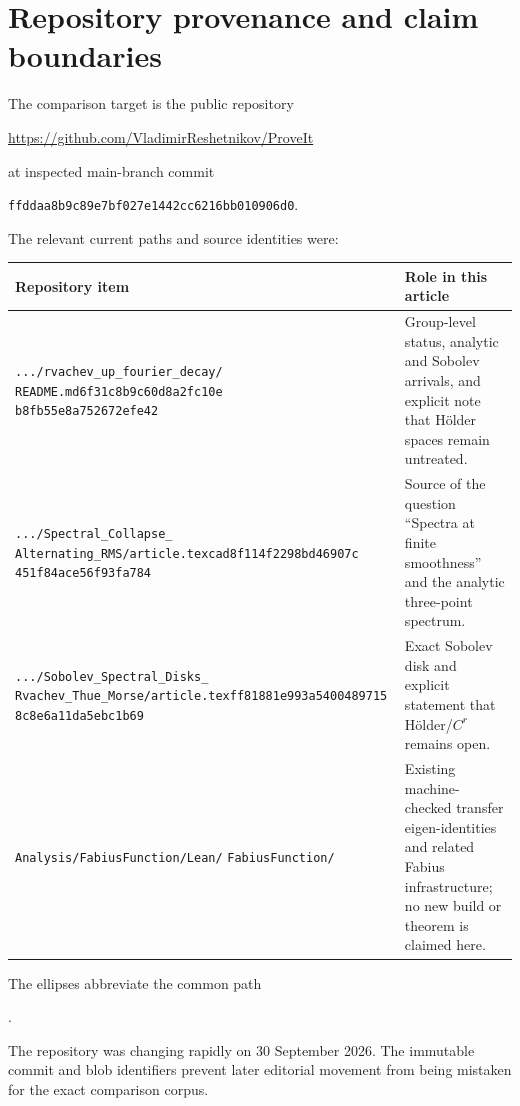 \documentclass[11pt,a4paper]{article}
\theoremstyle{definition}
\theoremstyle{remark}
\begin{document}
\section{Repository provenance and claim boundaries}
\label{app:provenance}
The comparison target is the public repository
\begin{center}
\url{https://github.com/VladimirReshetnikov/ProveIt}
\end{center}
at inspected main-branch commit
\begin{center}
\texttt{ffddaa8b9c89e7bf027e1442cc6216bb010906d0}.
\end{center}
The relevant current paths and source identities were:
\begin{center}
\small
\begin{tabularx}{\textwidth}{@{}L{0.42\textwidth}Y@{}}
\toprule
Repository item & Role in this article\\
\midrule
\texttt{.../rvachev\_up\_fourier\_decay/}\newline
\texttt{README.md}\newline
{\scriptsize\texttt{6f31c8b9c60d8a2fc10e}\newline
\texttt{b8fb55e8a752672efe42}}
& Group-level status, analytic and Sobolev arrivals, and explicit note that
H\"older spaces remain untreated.\\
\texttt{.../Spectral\_Collapse\_}\newline
\texttt{Alternating\_RMS/article.tex}\newline
{\scriptsize\texttt{cad8f114f2298bd46907c}\newline
\texttt{451f84ace56f93fa784}}
& Source of the question ``Spectra at finite smoothness'' and the analytic
three-point spectrum.\\
\texttt{.../Sobolev\_Spectral\_Disks\_}\newline
\texttt{Rvachev\_Thue\_Morse/article.tex}\newline
{\scriptsize\texttt{ff81881e993a5400489715}\newline
\texttt{8c8e6a11da5ebc1b69}}
& Exact Sobolev disk and explicit statement that H\"older/$C^r$ remains open.\\
\texttt{Analysis/FabiusFunction/Lean/}\newline
\texttt{FabiusFunction/}
& Existing machine-checked transfer eigen-identities and related Fabius
infrastructure; no new build or theorem is claimed here.\\
\bottomrule
\end{tabularx}
\end{center}
The ellipses abbreviate the common path
\begin{center}\small
{}.
\end{center}
The repository was changing rapidly on 30 September 2026.  The immutable
commit and blob identifiers prevent later editorial movement from being
mistaken for the exact comparison corpus.
\end{document}
